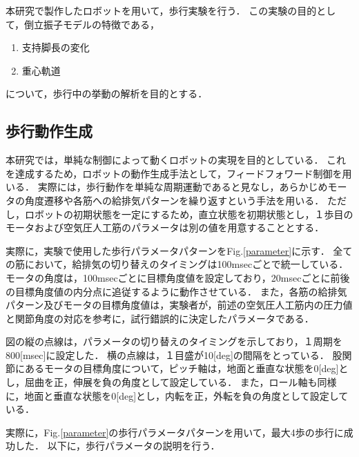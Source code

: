 本研究で製作したロボットを用いて，歩行実験を行う．
この実験の目的として，倒立振子モデルの特徴である，

\begin{enumerate}
 \item 支持脚長の変化
 \item 重心軌道
\end{enumerate}

について，歩行中の挙動の解析を目的とする．



\subsection{歩行動作生成}
本研究では，単純な制御によって動くロボットの実現を目的としている．
これを達成するため，ロボットの動作生成手法として，フィードフォワード制御を用いる．
実際には，歩行動作を単純な周期運動であると見なし，あらかじめモータの角度遷移や各筋への給排気パターンを繰り返すという手法を用いる．
ただし，ロボットの初期状態を一定にするため，直立状態を初期状態とし，１歩目のモータおよび空気圧人工筋のパラメータは別の値を用意することとする．

実際に，実験で使用した歩行パラメータパターンをFig.\ref{parameter}に示す．
全ての筋において，給排気の切り替えのタイミングは100msecごとで統一している．
モータの角度は，100msecごとに目標角度値を設定しており，20msecごとに前後の目標角度値の内分点に追従するように動作させている．
また，各筋の給排気パターン及びモータの目標角度値は，実験者が，前述の空気圧人工筋内の圧力値と関節角度の対応を参考に，試行錯誤的に決定したパラメータである．

図の縦の点線は，パラメータの切り替えのタイミングを示しており，１周期を800[msec]に設定した．
横の点線は，１目盛が10[deg]の間隔をとっている．
股関節にあるモータの目標角度について，ピッチ軸は，地面と垂直な状態を0[deg]とし，屈曲を正，伸展を負の角度として設定している．
また，ロール軸も同様に，地面と垂直な状態を0[deg]とし，内転を正，外転を負の角度として設定している．

実際に，Fig.\ref{parameter}の歩行パラメータパターンを用いて，最大4歩の歩行に成功した．
以下に，歩行パラメータの説明を行う．

